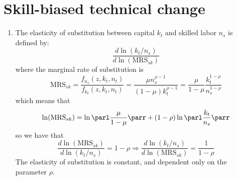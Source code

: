 \documentclass[10pt]{article}
\begin{document}
\maketitle

\section*{Skill-biased technical change}

\begin{enumerate}
	\item The elasticity of substitution between capital $k_t$ and skilled labor $n_s$ is defined by:\[\frac{d \ln(k_t / n_s)}{d \ln (\text{MRS}_{sk})} \]where the marginal rate of substitution is \[\text{MRS}_{sk} = \frac{f_{n_s}(z,k_t,n_t)}{f_{k_t}(z,k_t,n_t)} = \frac{\mu n_s^{\rho-1}}{(1-\mu)k_t^{\rho - 1}} = \frac{\mu}{1-\mu} \frac{k_t^{1-\rho}}{n_s^{1-\rho}}\]which means that\[\ln(\text{MRS}_{sk}) = \ln\parl \frac{\mu}{1-\mu}\parr + (1-\rho) \ln\parl\frac{k_t}{n_s}\parr\] so we have that\[\frac{d\ln(\text{MRS}_{sk})}{d\ln(k_t/n_s)} = 1-\rho \Longrightarrow \frac{d \ln(k_t / n_s)}{d \ln (\text{MRS}_{sk})} = \frac{1}{1-\rho}\]The elasticity of substitution is constant, and dependent only on the parameter $\rho$.

\end{enumerate}
\end{document}
